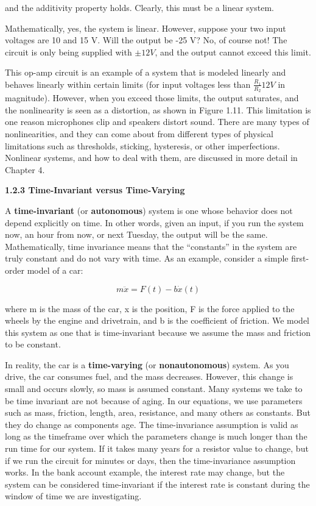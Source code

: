 \documentclass[12pt]{article}
\begin{document}
and the additivity property holds. Clearly, this must be a linear system.

Mathematically, yes, the system is linear. However, suppose your two
input voltages are 10 and 15 V. Will the output be -25 V? No, of course
not! The circuit is only being supplied with $\pm 12 V$, and the output cannot
exceed this limit.

This op-amp circuit is an example of a system that is modeled linearly
and behaves linearly within certain limits (for input voltages less than
$\frac{R_1}{R_2} 12 V$ in magnitude). However, when you exceed those limits, the output
saturates, and the nonlinearity is seen as a distortion, as shown in
Figure 1.11. This limitation is one reason microphones clip and speakers
distort sound.
There are many types of nonlinearities, and they can come about from
different types of physical limitations such as thresholds, sticking, hysteresis,
or other imperfections. Nonlinear systems, and how to deal with them, are
discussed in more detail in Chapter 4.

\hfill

\textbf{1.2.3 Time-Invariant versus Time-Varying}

\hfill

A \textbf{time-invariant} (or \textbf{autonomous}) system is one whose behavior does
not depend explicitly on time. In other words, given an input, if you run
the system now, an hour from now, or next Tuesday, the output will be the
same. Mathematically, time invariance means that the “constants” in the
system are truly constant and do not vary with time.
As an example, consider a simple first-order model of a car:

\[
m \ddot{x} = F(t) - b \dot{x} (t)
\]

where m is the mass of the car, x is the position, F is the force applied to the
wheels by the engine and drivetrain, and b is the coefficient of friction. We
model this system as one that is time-invariant because we assume the mass
and friction to be constant.

In reality, the car is a \textbf{time-varying} (or \textbf{nonautonomous}) system. As
you drive, the car consumes fuel, and the mass decreases. However, this
change is small and occurs slowly, so mass is assumed constant. Many systems
we take to be time invariant are not because of aging. In our equations,
we use parameters such as mass, friction, length, area, resistance, and
many others as constants. But they do change as components age. The
time-invariance assumption is valid as long as the timeframe over which the
parameters change is much longer than the run time for our system. If it
takes many years for a resistor value to change, but if we run the circuit for
minutes or days, then the time-invariance assumption works. In the bank
account example, the interest rate may change, but the system can be
considered time-invariant if the interest rate is constant during the window
of time we are investigating.
\end{document}
